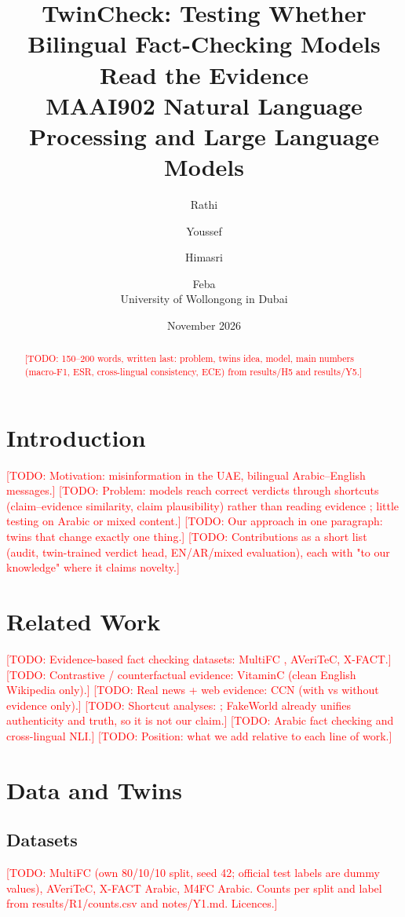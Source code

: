 \documentclass[11pt,a4paper]{article}
\title{TwinCheck: Testing Whether Bilingual Fact-Checking Models Read the Evidence\\
\large MAAI902 Natural Language Processing and Large Language Models}
\author{Rathi \and Youssef \and Himasri \and Feba\\
University of Wollongong in Dubai}
\date{November 2026}
\newcommand{\todo}[1]{\textcolor{red}{[TODO: #1]}}
\begin{document}
\maketitle

\begin{abstract}
\todo{150--200 words, written last: problem, twins idea, model, main numbers
(macro-F1, ESR, cross-lingual consistency, ECE) from results/H5 and results/Y5.}
\end{abstract}

\section{Introduction}
\label{sec:intro}
\todo{Motivation: misinformation in the UAE, bilingual Arabic--English messages.}
\todo{Problem: models reach correct verdicts through shortcuts (claim--evidence
similarity, claim plausibility) rather than reading evidence \citep{papadopoulos2025similarity};
little testing on Arabic or mixed content.}
\todo{Our approach in one paragraph: twins that change exactly one thing.}
\todo{Contributions as a short list (audit, twin-trained verdict head, EN/AR/mixed evaluation),
each with "to our knowledge" where it claims novelty.}

\section{Related Work}
\label{sec:related}
\todo{Evidence-based fact checking datasets: MultiFC \citep{augenstein2019multifc}, AVeriTeC, X-FACT.}
\todo{Contrastive / counterfactual evidence: VitaminC \citep{schuster2021vitaminc} (clean English Wikipedia only).}
\todo{Real news + web evidence: CCN \citep{abdelnabi2022ccn} (with vs without evidence only).}
\todo{Shortcut analyses: \citet{papadopoulos2025similarity}; FakeWorld \citep{fakeworld2026}
already unifies authenticity and truth, so it is not our claim.}
\todo{Arabic fact checking and cross-lingual NLI.}
\todo{Position: what we add relative to each line of work.}

\section{Data and Twins}
\label{sec:data}
\subsection{Datasets}
\todo{MultiFC (own 80/10/10 split, seed 42; official test labels are dummy values),
AVeriTeC, X-FACT Arabic, M4FC Arabic. Counts per split and label from results/R1/counts.csv
and notes/Y1.md. Licences.}
\end{document}
